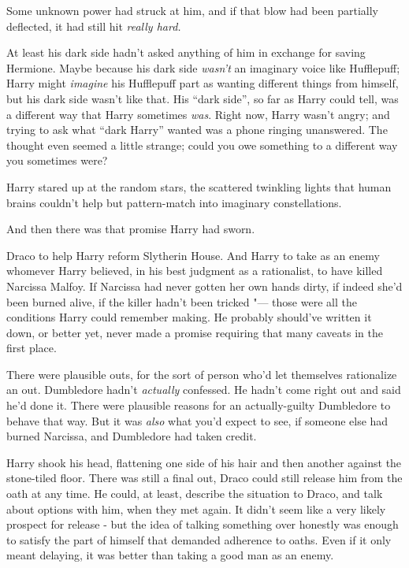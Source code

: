 Some unknown power had struck at him, and if that blow had been
partially deflected, it had still hit \emph{really hard.}

At least his dark side hadn't asked anything of him in exchange for
saving Hermione. Maybe because his dark side \emph{wasn't} an imaginary
voice like Hufflepuff; Harry might \emph{imagine} his Hufflepuff part as
wanting different things from himself, but his dark side wasn't like
that. His ``dark side'', so far as Harry could tell, was a different way
that Harry sometimes \emph{was}. Right now, Harry wasn't angry; and
trying to ask what ``dark Harry'' wanted was a phone ringing unanswered.
The thought even seemed a little strange; could you owe something to a
different way you sometimes were?

Harry stared up at the random stars, the scattered twinkling lights that
human brains couldn't help but pattern-match into imaginary
constellations.

And then there was that promise Harry had sworn.

Draco to help Harry reform Slytherin House. And Harry to take as an
enemy whomever Harry believed, in his best judgment as a rationalist, to
have killed Narcissa Malfoy. If Narcissa had never gotten her own hands
dirty, if indeed she'd been burned alive, if the killer hadn't been
tricked "--- those were all the conditions Harry could remember making. He
probably should've written it down, or better yet, never made a promise
requiring that many caveats in the first place.

There were plausible outs, for the sort of person who'd let themselves
rationalize an out. Dumbledore hadn't \emph{actually} confessed. He
hadn't come right out and said he'd done it. There were plausible
reasons for an actually-guilty Dumbledore to behave that way. But it was
\emph{also} what you'd expect to see, if someone else had burned
Narcissa, and Dumbledore had taken credit.

Harry shook his head, flattening one side of his hair and then another
against the stone-tiled floor. There was still a final out, Draco could
still release him from the oath at any time. He could, at least,
describe the situation to Draco, and talk about options with him, when
they met again. It didn't seem like a very likely prospect for release -
but the idea of talking something over honestly was enough to satisfy
the part of himself that demanded adherence to oaths. Even if it only
meant delaying, it was better than taking a good man as an enemy.

